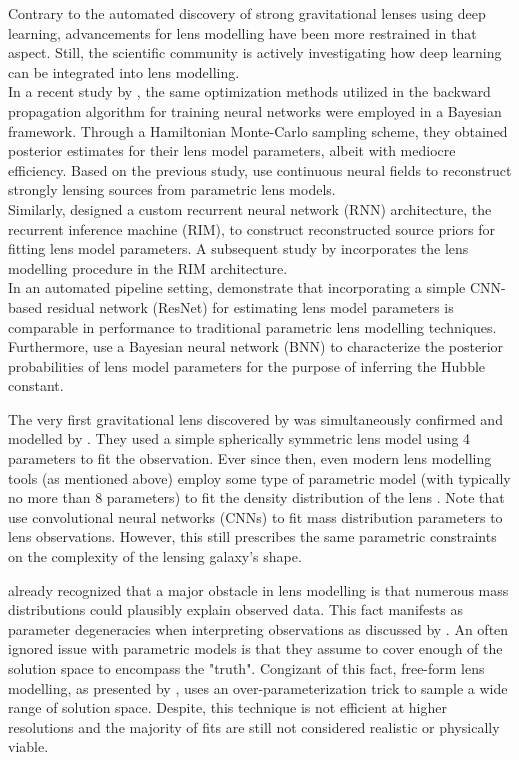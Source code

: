 \documentclass[a4paper,10pt]{article}
\begin{document}
Contrary to the automated discovery of strong gravitational lenses
using deep learning, advancements for lens modelling have been more
restrained in that aspect. Still, the scientific community is actively
investigating how deep learning can be integrated into lens
modelling. \\[0pt]
In a recent study by \cite{Gu22}, the same optimization methods
utilized in the backward propagation algorithm for training neural
networks were employed in a Bayesian framework. Through a Hamiltonian
Monte-Carlo sampling scheme, they obtained posterior estimates for
their lens model parameters, albeit with mediocre efficiency. Based on
the previous study, \cite{Mishra-Sharma22} use continuous neural
fields to reconstruct strongly lensing sources from parametric lens
models. \\[0pt]
Similarly, \cite{Morningstar19} designed a custom recurrent neural
network (RNN) architecture, the recurrent inference machine (RIM), to
construct reconstructed source priors for fitting lens model
parameters. A subsequent study by \cite{Adam22} incorporates the
lens modelling procedure in the RIM architecture. \\[0pt]
In an automated pipeline setting, \cite{Schuldt22,Chianese19}
demonstrate that incorporating a simple CNN-based residual network
(ResNet) for estimating lens model parameters is comparable in
performance to traditional parametric lens modelling techniques. \\[0pt]
Furthermore, \cite{Park20} use a Bayesian neural network (BNN) to
characterize the posterior probabilities of lens model parameters for
the purpose of inferring the Hubble constant.

The very first gravitational lens discovered by \cite{Walsh79} was
simultaneously confirmed and modelled by \cite{Young80}. They used
a simple spherically symmetric lens model using 4 parameters to fit
the observation. Ever since then, even modern lens modelling tools (as
mentioned above) employ some type of parametric model (with typically
no more than 8 parameters) to fit the density distribution of the lens
\citep[cf.][]{Birrer18,Hezaveh17,Tessore16,Oguri10}. Note that
\cite{Hezaveh17} use convolutional neural networks (CNNs) to fit
mass distribution parameters to lens observations. However, this still
prescribes the same parametric constraints on the complexity of the
lensing galaxy's shape.

\cite{Young81} already recognized that a major obstacle in lens
modelling is that numerous mass distributions could plausibly explain
observed data. This fact manifests as parameter degeneracies when
interpreting observations as discussed by
\cite{Saha00,Saha06,Schneider14,Birrer21}.  An often ignored issue
with parametric models is that they assume to cover enough of the
solution space to encompass the "truth".  Congizant of this fact,
free-form lens modelling, as presented by \citep{Saha04}, uses an
over-parameterization trick to sample a wide range of solution
space. Despite, this technique is not efficient at higher resolutions
and the majority of fits are still not considered realistic or
physically viable.
\end{document}
